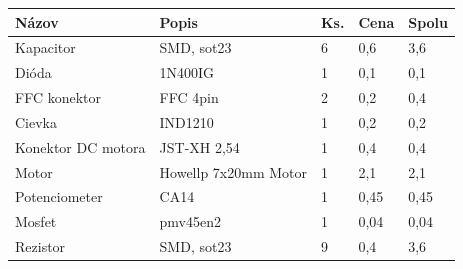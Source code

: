 \begin{table}[!ht]
	\begin{tabular}{p{} p{} p{} p{} p{}}
		\hline
		\multicolumn{1}{|l}{\textbf{Názov}} & \textbf{Popis}                                     & \multicolumn{1}{l}{\textbf{Ks.}} & \multicolumn{1}{l}{\textbf{Cena}} & \multicolumn{1}{l|}{\textbf{Spolu}} \\ \hline
		Kapacitor                           & SMD, sot23                                         & 6                                  & 0,6                                      & 3,6                                        \\
		Dióda                               & 1N400IG                                            & 1                                  & 0,1                                      & 0,1                                        \\
		FFC konektor                        & FFC 4pin                                           & 2                                  & 0,2                                      & 0,4                                        \\
		Cievka                              & IND1210                                            & 1                                  & 0,2                                      & 0,2                                        \\
		Konektor DC motora                  & JST-XH 2,54                                        & 1                                  & 0,4                                      & 0,4                                        \\
		Motor                               & Howellp 7x20mm Motor                               & 1                                  & 2,1                                      & 2,1                                        \\
		Potenciometer                       & CA14                                               & 1                                  & 0,45                                     & 0,45                                       \\
		Mosfet                              & pmv45en2                                           & 1                                  & 0,04                                     & 0,04                                       \\
		Rezistor                            & SMD, sot23                                         & 9                                  & 0,4                                      & 3,6                                        \\

\end{tabular}
\end{table}
